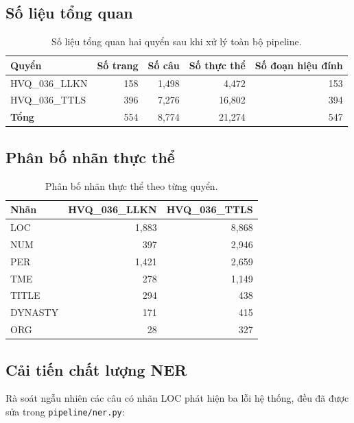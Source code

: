 \documentclass[12pt,a4paper]{article}
\begin{document}
\subsection{Số liệu tổng quan}

\begin{table}[h]
\centering
\begin{tabular}{lrrrr}
\toprule
Quyển & Số trang & Số câu & Số thực thể & Số đoạn hiệu đính \\
\midrule
HVQ\_036\_LLKN & 158 & 1{,}498 & 4{,}472 & 153 \\
HVQ\_036\_TTLS & 396 & 7{,}276 & 16{,}802 & 394 \\
\midrule
\textbf{Tổng} & 554 & 8{,}774 & 21{,}274 & 547 \\
\bottomrule
\end{tabular}
\caption{Số liệu tổng quan hai quyển sau khi xử lý toàn bộ pipeline.}
\end{table}

\subsection{Phân bố nhãn thực thể}

\begin{table}[h]
\centering
\begin{tabular}{lrr}
\toprule
Nhãn & HVQ\_036\_LLKN & HVQ\_036\_TTLS \\
\midrule
LOC     & 1{,}883 & 8{,}868 \\
NUM     & 397     & 2{,}946 \\
PER     & 1{,}421 & 2{,}659 \\
TME     & 278     & 1{,}149 \\
TITLE   & 294     & 438 \\
DYNASTY & 171     & 415 \\
ORG     & 28      & 327 \\
\bottomrule
\end{tabular}
\caption{Phân bố nhãn thực thể theo từng quyển.}
\end{table}

\subsection{Cải tiến chất lượng NER}

Rà soát ngẫu nhiên các câu có nhãn LOC phát hiện ba lỗi hệ thống, đều đã được
sửa trong \texttt{pipeline/ner.py}:
\end{document}
